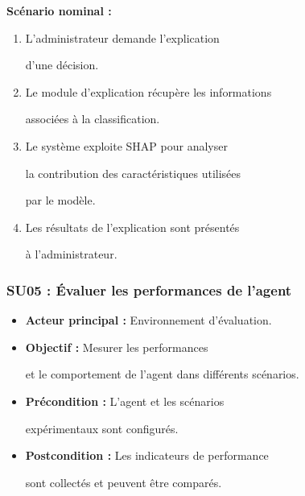 \textbf{Scénario nominal :}

\begin{enumerate}

    \item L'administrateur demande l'explication

    d'une décision.

    \item Le module d'explication récupère les informations

    associées à la classification.

    \item Le système exploite SHAP pour analyser

    la contribution des caractéristiques utilisées

    par le modèle.

    \item Les résultats de l'explication sont présentés

    à l'administrateur.

\end{enumerate}





\subsubsection{SU05 : Évaluer les performances de l'agent}



\begin{itemize}

    \item \textbf{Acteur principal :} Environnement d'évaluation.

    \item \textbf{Objectif :} Mesurer les performances

    et le comportement de l'agent dans différents scénarios.

    \item \textbf{Précondition :} L'agent et les scénarios

    expérimentaux sont configurés.

    \item \textbf{Postcondition :} Les indicateurs de performance

    sont collectés et peuvent être comparés.

\end{itemize}



